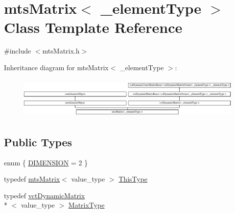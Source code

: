 \hypertarget{classmts_matrix}{\section{mts\-Matrix$<$ \-\_\-element\-Type $>$ Class Template Reference}
\label{classmts_matrix}
}


{\ttfamily \#include $<$mts\-Matrix.\-h$>$}

Inheritance diagram for mts\-Matrix$<$ \-\_\-element\-Type $>$\-:\begin{figure}[H]
\begin{center}
\leavevmode
\includegraphics[height=2.101313cm]{de/d36/classmts_matrix}
\end{center}
\end{figure}
\subsection*{Public Types}
\begin{DoxyCompactItemize}
\item 
enum \{ \hyperlink{classmts_matrix_a6d975d68961523d5ea32a357ca4fe73ba6aacbb86e5a9e8a2865163a7182717de}{D\-I\-M\-E\-N\-S\-I\-O\-N} = 2
 \}
\item 
typedef \hyperlink{classmts_matrix}{mts\-Matrix}$<$ value\-\_\-type $>$ \hyperlink{classmts_matrix_abebbde6e54b4a6e574c42a99bc015524}{This\-Type}
\item 
typedef \hyperlink{classvct_dynamic_matrix}{vct\-Dynamic\-Matrix}\\*
$<$ value\-\_\-type $>$ \hyperlink{classmts_matrix_af0f57fd565d954a7485dcb26a384d64a}{Matrix\-Type}
\end{DoxyCompactItemize}
